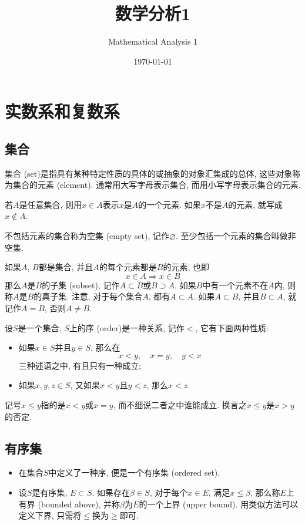 \documentclass[cn,12pt,math=mtpro2,citestyle=gb7714-2015,bibstyle=gb7714-2015,twocol]{elegantbook}
\title{数学分析1}
\subtitle{Mathematical Analysis 1}
\date{\today}
\let\emptyset\varnothing
\begin{document}
\maketitle
\frontmatter

\tableofcontents

\mainmatter

\chapter{实数系和复数系}
\section{集合}
\begin{definition}
集合 (set)是指具有某种特定性质的具体的或抽象的对象汇集成的总体, 这些对象称为集合的元素 (element). 通常用大写字母表示集合, 而用小写字母表示集合的元素.
\end{definition}

若$A$是任意集合, 则用$x\in A$表示$x$是$A$的一个元素. 如果$x$不是$A$的元素, 就写成$x \notin A$.

不包括元素的集合称为空集 (empty set), 记作$\emptyset$. 至少包括一个元素的集合叫做非空集.

如果$A$, $B$都是集合, 并且$A$的每个元素都是$B$的元素, 也即
$$x\in A\Rightarrow x\in B$$
那么$A$是$B$的子集 (subset), 记作$A \subset B$或$B \supset A$. 如果$B$中有一个元素不在$A$内, 则称$A$是$B$的真子集. 注意, 对于每个集合$A$, 都有$A\subset A$. 如果$A\subset B$, 并且$B\subset A$, 就记作$A=B$, 否则$A\neq B$.


\begin{definition}
设$S$是一个集合, $S$上的序 (order)是一种关系, 记作$<$, 它有下面两种性质:
\begin{itemize}
\item 如果$x \in S$并且$y\in S$, 那么在
$$x<y,\quad x=y, \quad y<x$$
三种述语之中, 有且只有一种成立;

\item 如果$x, y, z \in S$, 又如果$x<y$且$y<z$, 那么$x<z$.
\end{itemize}
\end{definition}

记号$x\leq y$指的是$x<y$或$x=y$, 而不细说二者之中谁能成立. 换言之$x\leq y$是$x>y$的否定.
\section{有序集}
\begin{definition}
\begin{itemize}
\item 在集合$S$中定义了一种序, 便是一个有序集 (ordered set).

\item 设$S$是有序集, $E\subset S$. 如果存在$\beta \in S$, 对于每个$x \in E$, 满足$x\leq \beta$, 那么称$E$上有界 (bounded above), 并称$\beta$为$E$的一个上界 (upper bound). 用类似方法可以定义下界, 只需将$\leq$换为$\geq$即可.
\end{itemize}
\end{definition}
\end{document}

